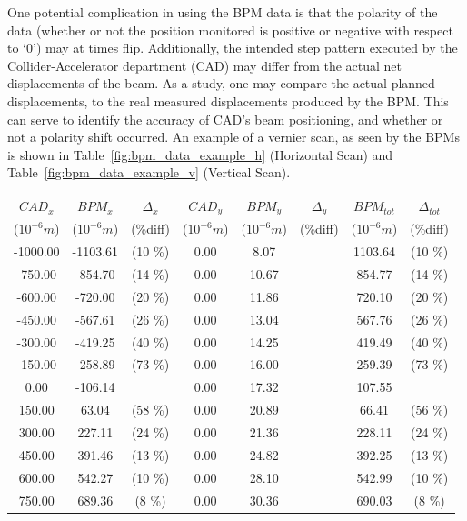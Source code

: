 One potential complication in using the BPM data is that the polarity of the
data (whether or not the position monitored is positive or negative with respect
to `0') may at times flip. Additionally, the intended step pattern executed by
the Collider-Accelerator department (CAD) may differ from the actual net
displacements of the beam. As a study, one may compare the actual planned
displacements, to the real measured displacements produced by the BPM. This can
serve to identify the accuracy of CAD's beam positioning, and whether or not a
polarity shift occurred. An example of a vernier scan, as seen by the BPMs is
shown in Table~\ref{fig:bpm_data_example_h} (Horizontal Scan) and
Table~\ref{fig:bpm_data_example_v} (Vertical Scan).

\begin{table}[ht]
  \centering
  \begin{tabular}{c c c c c c c c}
    \toprule
    \textbf{$CAD_{x}$} & \textbf{$BPM_{x}$ } & \textbf{$\Delta_{x}$} &\textbf{$CAD_{y}$} & \textbf{$BPM_{y}$} & \textbf{$\Delta_{y}$} & \textbf{$BPM_{tot}$} & \textbf{$\Delta_{tot}$} \\
    ($10^{-6} m$) & ($10^{-6} m$) & (\%diff) & ($10^{-6} m$) & ($10^{-6} m$) & (\%diff) & ($10^{-6} m$) & (\%diff) \\
    \midrule
    -1000.00 & -1103.61 &  (10 \%) & 0.00 & 8.07 &  & 1103.64 &  (10 \%)\\
    -750.00 & -854.70 &  (14 \%) & 0.00 & 10.67 &  & 854.77 &  (14 \%)\\
    -600.00 & -720.00 &  (20 \%) & 0.00 & 11.86 &  & 720.10 &  (20 \%)\\
    -450.00 & -567.61 &  (26 \%) & 0.00 & 13.04 &  & 567.76 &  (26 \%)\\
    -300.00 & -419.25 &  (40 \%) & 0.00 & 14.25 &  & 419.49 &  (40 \%)\\
    -150.00 & -258.89 &  (73 \%) & 0.00 & 16.00 &  & 259.39 &  (73 \%)\\
    0.00 & -106.14 &  & 0.00 & 17.32 &  & 107.55 & \\
    150.00 & 63.04 &  (58 \%) & 0.00 & 20.89 &  & 66.41 &  (56 \%)\\
    300.00 & 227.11 &  (24 \%) & 0.00 & 21.36 &  & 228.11 &  (24 \%)\\
    450.00 & 391.46 &  (13 \%) & 0.00 & 24.82 &  & 392.25 &  (13 \%)\\
    600.00 & 542.27 &  (10 \%) & 0.00 & 28.10 &  & 542.99 &  (10 \%)\\
    750.00 & 689.36 &  (8 \%) & 0.00 & 30.36 &  & 690.03 &  (8 \%)\\

\end{tabular}
\end{table}
